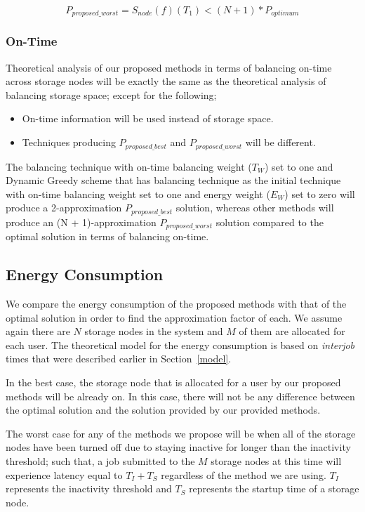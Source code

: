\begin{equation}
P_{proposed\_worst} = S_{node}(f)(T_1) < (N + 1) * P_{optimum}
\label{eq_th_fifteen}
\end{equation}
\hfill

\subsubsection{On-Time}
Theoretical analysis of our proposed methods in terms of balancing on-time across storage
nodes will be exactly the same as the theoretical analysis of balancing storage space; except
for the following;

\begin{itemize}
\item On-time information will be used instead of storage space.
\item Techniques producing $P_{proposed\_best}$ and $P_{proposed\_worst}$
will be different.
\end{itemize}

The balancing technique with on-time balancing weight ($T_W$) set to one and Dynamic Greedy scheme
that has balancing technique as the initial technique with on-time balancing weight set to one
and energy weight ($E_W$) set to zero will produce a 2-approximation $P_{proposed\_best}$ solution,
whereas other methods will produce an (N + 1)-approximation $P_{proposed\_worst}$ solution
compared to the optimal solution in terms of balancing on-time.

\subsection{Energy Consumption}
We compare the energy consumption of the proposed methods with that of the
optimal solution in order to find the approximation factor of each. We assume
again there are $N$ storage nodes in the system and $M$ of them are allocated
for each user. The theoretical model for the energy consumption is based
on \textit{interjob} times that were described earlier in Section~\ref{model}.

In the best case, the storage node that is allocated for a user by our proposed
methods will be already on. In this case, there will not be any difference
between the optimal solution and the solution provided by our provided methods.

The worst case for any of the methods we propose will be when all of the
storage nodes have been turned off due to staying inactive for longer than
the inactivity threshold; such that, a job submitted to the $M$ storage nodes
at this time will experience latency equal to $T_I + T_S$ regardless
of the method we are using. $T_I$ represents the inactivity threshold and
$T_S$ represents the startup time of a storage node.

